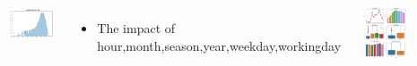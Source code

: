 \documentclass{tikzposter} %
\begin{document}
\begin{columns}
{\begin{minipage}{0.33\linewidth}
        \centering
        \includegraphics[width=1\textwidth]{pic1/log.png} 
    \end{minipage}
    \begin{itemize}                            
        \item
        The impact of hour,month,season,year,weekday,workingday
    \end{itemize}
    \begin{minipage}{1\linewidth}
        \centering
        \includegraphics[width=0.5\textwidth]{pic1/count all.png} 
    \end{minipage}
}




\end{columns}
\end{document}
